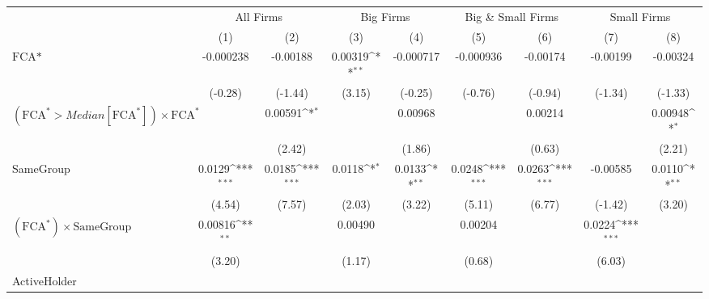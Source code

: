 {
\def\sym#1{\ifmmode^{#1}\else\(^{#1}\)\fi}
\begin{tabular}{l*{8}{c}}
\hline\hline
                &\multicolumn{2}{c}{All Firms}        &\multicolumn{2}{c}{Big Firms}        &\multicolumn{2}{c}{Big \& Small Firms}&\multicolumn{2}{c}{Small Firms}      \\\cmidrule(lr){2-3}\cmidrule(lr){4-5}\cmidrule(lr){6-7}\cmidrule(lr){8-9}
                &\multicolumn{1}{c}{(1)}         &\multicolumn{1}{c}{(2)}         &\multicolumn{1}{c}{(3)}         &\multicolumn{1}{c}{(4)}         &\multicolumn{1}{c}{(5)}         &\multicolumn{1}{c}{(6)}         &\multicolumn{1}{c}{(7)}         &\multicolumn{1}{c}{(8)}         \\
\hline
$ \text{FCA*} $ &-0.000238         & -0.00188         &  0.00319\sym{**} &-0.000717         &-0.000936         & -0.00174         & -0.00199         & -0.00324         \\
                &  (-0.28)         &  (-1.44)         &   (3.15)         &  (-0.25)         &  (-0.76)         &  (-0.94)         &  (-1.34)         &  (-1.33)         \\
[1em]
 $ (\text{FCA}^* > Median[\text{FCA}^*]) \times {\text{FCA} ^*}  $ &                  &  0.00591\sym{*}  &                  &  0.00968         &                  &  0.00214         &                  &  0.00948\sym{*}  \\
                &                  &   (2.42)         &                  &   (1.86)         &                  &   (0.63)         &                  &   (2.21)         \\
[1em]
SameGroup       &   0.0129\sym{***}&   0.0185\sym{***}&   0.0118\sym{*}  &   0.0133\sym{**} &   0.0248\sym{***}&   0.0263\sym{***}& -0.00585         &   0.0110\sym{**} \\
                &   (4.54)         &   (7.57)         &   (2.03)         &   (3.22)         &   (5.11)         &   (6.77)         &  (-1.42)         &   (3.20)         \\
[1em]
 $ (\text{FCA}^*) \times {\text{SameGroup} }  $ &  0.00816\sym{**} &                  &  0.00490         &                  &  0.00204         &                  &   0.0224\sym{***}&                  \\
                &   (3.20)         &                  &   (1.17)         &                  &   (0.68)         &                  &   (6.03)         &                  \\
[1em]
ActiveHolder    &                  &                  &                  &                  &                  &                  &                  &                  \\

\end{tabular}}
